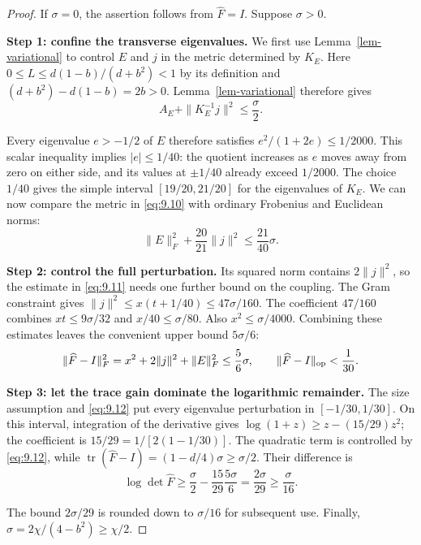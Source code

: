 \begin{proof}
If $\sigma=0$, the assertion follows from $\widehat F=I$.
Suppose $\sigma>0$.

\textbf{Step 1: confine the transverse eigenvalues.} We first use Lemma~\ref{lem-variational} to
control $E$ and $j$ in the metric determined by $K_E$.
Here $0\le L\le d(1-b)/(d+b^2)<1$ by its definition and
$(d+b^2)-d(1-b)=2b>0$. Lemma~\ref{lem-variational} therefore gives
\begin{equation}\label{eq:9.10}
A_E+\|K_E^{-1}j\|^2\le\frac\sigma2.
\end{equation}

Every eigenvalue $e>-1/2$ of $E$ therefore satisfies
$e^2/(1+2e)\le1/2000$. This scalar inequality implies $|e|\le1/40$:
the quotient increases as $e$ moves away from zero on either side, and its
values at $\pm1/40$ already exceed $1/2000$.
The choice $1/40$ gives the simple interval $[19/20,21/20]$ for the eigenvalues
of $K_E$. We can now compare the metric in \eqref{eq:9.10} with ordinary Frobenius
and Euclidean norms:
\begin{equation}\label{eq:9.11}
\|E\|_F^2+\frac{20}{21}\|j\|^2\le\frac{21}{40}\sigma.
\end{equation}

\textbf{Step 2: control the full perturbation.} Its squared norm contains
$2\|j\|^2$, so the estimate in \eqref{eq:9.11} needs one further bound on the coupling.
The Gram constraint gives $\|j\|^2\le x(t+1/40)\le47\sigma/160$.
The coefficient $47/160$ combines $xt\le9\sigma/32$ and
$x/40\le\sigma/80$. Also $x^2\le\sigma/4000$.
Combining these estimates leaves the convenient upper bound $5\sigma/6$:
\begin{equation}\label{eq:9.12}
\|\widehat F-I\|_F^2=x^2+2\|j\|^2+\|E\|_F^2\le\frac56\sigma,
\qquad \|\widehat F-I\|_{\rm op}<\frac1{30}.
\end{equation}

\textbf{Step 3: let the trace gain dominate the logarithmic remainder.}
The size assumption and \eqref{eq:9.12} put every eigenvalue perturbation in
$[-1/30,1/30]$. On this interval, integration of the derivative gives
$\log(1+z)\ge z-(15/29)z^2$; the coefficient is
$15/29=1/[2(1-1/30)]$.
The quadratic term is controlled by \eqref{eq:9.12}, while
$\operatorname{tr}(\widehat F-I)=(1-d/4)\sigma\ge\sigma/2$.
Their difference is
\begin{equation}\label{eq:9.13}
\log\det\widehat F\ge\frac\sigma2-\frac{15}{29}\frac{5\sigma}{6}
=\frac{2\sigma}{29}\ge\frac\sigma{16}.
\end{equation}

The bound $2\sigma/29$ is rounded down to $\sigma/16$ for subsequent use.
Finally, $\sigma=2\chi/(4-b^2)\ge\chi/2$. 
\end{proof}

